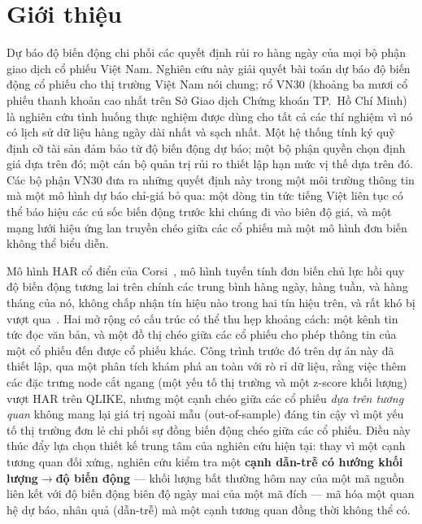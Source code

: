 \documentclass[runningheads]{llncs}
\begin{document}
\begin{abstract}
\end{abstract}
%
\section{Giới thiệu}
\label{sec:intro}
Dự báo độ biến động chi phối các quyết định rủi ro hàng ngày của mọi bộ phận giao dịch cổ phiếu Việt
Nam. Nghiên cứu này giải quyết bài toán dự báo độ biến động cổ phiếu cho thị trường Việt Nam nói chung;
rổ VN30 (khoảng ba mươi cổ phiếu thanh khoản cao nhất trên Sở Giao dịch Chứng khoán TP.\ Hồ Chí Minh)
là nghiên cứu tình huống thực nghiệm được dùng cho tất cả các thí nghiệm vì nó có lịch sử dữ liệu hàng
ngày dài nhất và sạch nhất. Một hệ thống tính ký quỹ định cỡ tài sản đảm bảo từ độ biến động dự báo; một
bộ phận quyền chọn định giá dựa trên đó; một cán bộ quản trị rủi ro thiết lập hạn mức vị thế dựa trên đó.
Các bộ phận VN30 đưa ra những quyết định này trong một môi trường thông tin mà một mô hình dự báo chỉ-giá
bỏ qua: một dòng tin tức tiếng Việt liên tục có thể báo hiệu các cú sốc biến động trước khi chúng đi vào
biên độ giá, và một mạng lưới hiệu ứng lan truyền chéo giữa các cổ phiếu mà một mô hình đơn biến không
thể biểu diễn.

Mô hình HAR cổ điển của Corsi~\cite{corsi2009}, mô hình tuyến tính đơn biến chủ lực hồi quy độ biến động
tương lai trên chính các trung bình hàng ngày, hàng tuần, và hàng tháng của nó, không chấp nhận tín hiệu
nào trong hai tín hiệu trên, và rất khó bị vượt qua~\cite{audrino2025}. Hai mở rộng có cấu trúc có thể
thu hẹp khoảng cách: một kênh tin tức đọc văn bản, và một đồ thị chéo giữa các cổ phiếu cho phép thông
tin của một cổ phiếu đến được cổ phiếu khác. Công trình trước đó trên dự án này đã thiết lập, qua một
phân tích khám phá an toàn với rò rỉ dữ liệu, rằng việc thêm các đặc trưng node cắt ngang (một yếu tố thị
trường và một z-score khối lượng) vượt HAR trên QLIKE, nhưng một cạnh chéo giữa các cổ phiếu \emph{dựa
trên tương quan} không mang lại giá trị ngoài mẫu (out-of-sample) đáng tin cậy vì một yếu tố thị trường
đơn lẻ chi phối sự đồng biến động chéo giữa các cổ phiếu. Điều này thúc đẩy lựa chọn thiết kế trung tâm
của nghiên cứu hiện tại: thay vì một cạnh tương quan đối xứng, nghiên cứu kiểm tra một \textbf{cạnh
dẫn-trễ có hướng khối lượng$\to$độ biến động} --- khối lượng bất thường hôm nay của một mã nguồn liên kết
với độ biến động biên độ ngày mai của một mã đích --- mã hóa một quan hệ dự báo, nhân quả (dẫn-trễ) mà
một cạnh tương quan đồng thời không thể có.
\end{document}
